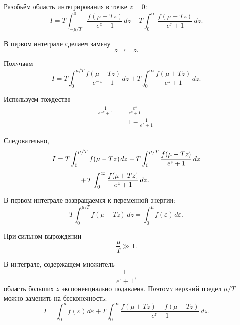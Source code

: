 \documentclass[../final.tex]{subfiles}
\begin{document}
Разобьём область интегрирования в точке $z=0$:
%
\begin{equation*}
    I
    =
    T
    \int_{-\mu/T}^{0}
    \frac{
        f(\mu+Tz)
    }{
        e^z+1
    }
    \,dz
    +
    T
    \int_0^\infty
    \frac{
        f(\mu+Tz)
    }{
        e^z+1
    }
    \,dz.
\end{equation*}

В первом интеграле сделаем замену
%
\begin{equation*}
    z
    \rightarrow
    -z.
\end{equation*}

Получаем
%
\begin{equation*}
    I
    =
    T
    \int_0^{\mu/T}
    \frac{
        f(\mu-Tz)
    }{
        e^{-z}+1
    }
    \,dz
    +
    T
    \int_0^\infty
    \frac{
        f(\mu+Tz)
    }{
        e^z+1
    }
    \,dz.
\end{equation*}

Используем тождество
%
\begin{align*}
    \frac{1}{e^{-z}+1}
    &=
    \frac{e^z}{e^z+1}
    \\[4pt]
    &=
    1
    -
    \frac{1}{e^z+1}.
\end{align*}

Следовательно,
%
\begin{align*}
    I
    &=
    T
    \int_0^{\mu/T}
    f(\mu-Tz)\,dz
    -
    T
    \int_0^{\mu/T}
    \frac{
        f(\mu-Tz)
    }{
        e^z+1
    }
    \,dz
    \\[4pt]
    &\hspace{1.2cm}
    +
    T
    \int_0^\infty
    \frac{
        f(\mu+Tz)
    }{
        e^z+1
    }
    \,dz.
\end{align*}

В первом интеграле возвращаемся к переменной энергии:
%
\begin{equation*}
    T
    \int_0^{\mu/T}
    f(\mu-Tz)\,dz
    =
    \int_0^\mu
    f(\varepsilon)\,d\varepsilon.
\end{equation*}

При сильном вырождении
%
\begin{equation*}
    \frac{\mu}{T}
    \gg
    1.
\end{equation*}

В интеграле, содержащем множитель
%
\begin{equation*}
    \frac{1}{e^z+1},
\end{equation*}
%
область больших $z$ экспоненциально подавлена. Поэтому верхний
предел $\mu/T$ можно заменить на бесконечность:
%
\begin{equation*}
    I
    =
    \int_0^\mu
    f(\varepsilon)\,d\varepsilon
    +
    T
    \int_0^\infty
    \frac{
        f(\mu+Tz)-f(\mu-Tz)
    }{
        e^z+1
    }
    \,dz.
\end{equation*}
\end{document}
